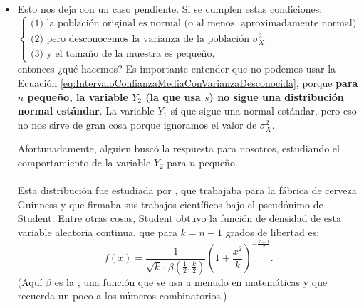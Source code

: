 \begin{itemize}
    \item Esto nos deja con un caso pendiente. Si se cumplen estas condiciones:
    \[\begin{cases}
     \mbox{(1) la población original es normal (o al menos, aproximadamente normal)}\\[3mm]
     \mbox{(2) pero desconocemos la varianza de la población $\sigma^2_X$}\\[3mm]
     \mbox{(3) y el tamaño de la muestra es pequeño,}
     \end{cases}
     \]
     entonces ¿qué hacemos? Es importante entender que no podemos usar la Ecuación \ref{eq:IntervaloConfianzaMediaConVarianzaDesconocida}, porque {\bf para $n$ pequeño, la variable $Y_2$ (la que usa $s$) no sigue una distribución normal estándar}. La variable $Y_1$ sí que sigue una normal estándar, pero eso no nos sirve de gran cosa porque ignoramos el valor de $\sigma^2_X$.

     Afortunadamente, alguien buscó la respuesta para nosotros, estudiando el comportamiento de la variable $Y_2$ para $n$ pequeño.\\[3mm]
     \\[3mm]
       Esta distribución fue estudiada por , que trabajaba para la fábrica de cerveza Guinness y que firmaba sus trabajos científicos bajo el pseudónimo de Student. Entre otras cosas, Student obtuvo la función de densidad de esta variable aleatoria continua, que para $k=n-1$ grados de libertad es:
       \[f(x)=\dfrac{1}{\sqrt{k}\cdot\beta(\frac{1}{2},\frac{k}{2})}\left(1+\dfrac{x^2}{k}\right)^{-\frac{k+1}{2}}.\]
       (Aquí $\beta$ es la , una función que se usa a menudo en matemáticas y que recuerda un poco a los números combinatorios.)


\end{itemize}
